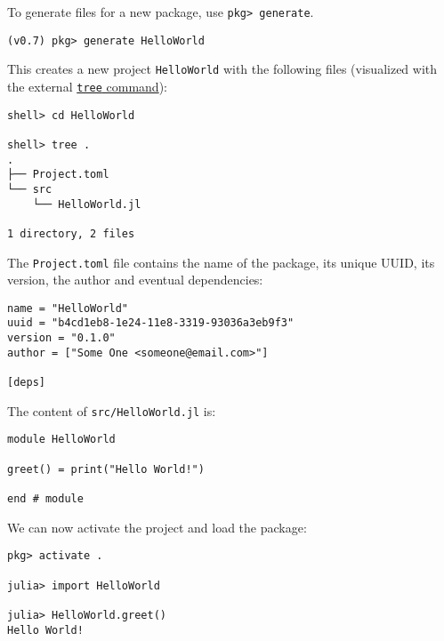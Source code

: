 To generate files for a new package, use \texttt{pkg> generate}.




\begin{lstlisting}
(v0.7) pkg> generate HelloWorld
\end{lstlisting}



This creates a new project \texttt{HelloWorld} with the following files (visualized with the external \href{https://linux.die.net/man/1/tree}{\texttt{tree} command}):




\begin{lstlisting}
shell> cd HelloWorld

shell> tree .
.
├── Project.toml
└── src
    └── HelloWorld.jl

1 directory, 2 files
\end{lstlisting}



The \texttt{Project.toml} file contains the name of the package, its unique UUID, its version, the author and eventual dependencies:




\begin{lstlisting}
name = "HelloWorld"
uuid = "b4cd1eb8-1e24-11e8-3319-93036a3eb9f3"
version = "0.1.0"
author = ["Some One <someone@email.com>"]

[deps]
\end{lstlisting}



The content of \texttt{src/HelloWorld.jl} is:




\begin{lstlisting}
module HelloWorld

greet() = print("Hello World!")

end # module
\end{lstlisting}



We can now activate the project and load the package:




\begin{lstlisting}
pkg> activate .

julia> import HelloWorld

julia> HelloWorld.greet()
Hello World!
\end{lstlisting}



\hypertarget{15262021635183704764}{}


